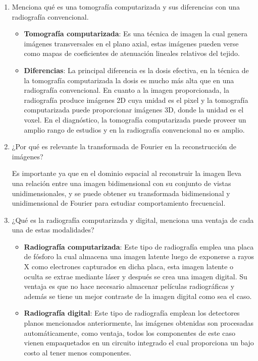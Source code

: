 \begin{enumerate}[1.]
\item Menciona qué es una tomografía computarizada y sus diferencias con una radiografía convencional.


\begin{itemize}
  \item \textbf{Tomografía computarizada}: Es una técnica de imagen la cual genera imágenes transversales en el plano axial, estas imágenes pueden verse como mapas de coeficientes de atenuación lineales relativos del tejido.
  \item \textbf{Diferencias}: La principal diferencia es la dosis efectiva, en la técnica de la tomografía computarizada la dosis es mucho más alta que en una radiografía convencional. En cuanto a la imagen proporcionada, la radiografía produce imágenes 2D cuya unidad es el pixel y la tomografía computarizada puede proporcionar imágenes 3D, donde la unidad es el voxel. En el diagnóstico, la tomografía computarizada puede proveer un amplio rango de estudios y en la radiografía convencional no es amplio.
\end{itemize}

\item ¿Por qué es relevante la transformada de Fourier en la reconstrucción de imágenes?


Es importante ya que en el dominio espacial al reconstruir la imagen lleva una relación entre una imagen bidimensional con su conjunto de vistas unidimensionales, y se puede obtener su transformada bidimensional y unidimensional de Fourier para estudiar comportamiento frecuencial.

\item  ¿Qué es la radiografía computarizada y digital, menciona una ventaja de cada una de estas modalidades?

\begin{itemize}
  \item \textbf{Radiografía computarizada}: Este tipo de radiografía emplea una placa de fósforo la cual almacena una imagen latente luego de exponerse a rayos X como electrones capturados en dicha placa, esta imagen latente o oculta se extrae mediante láser y después se crea una imagen digital. Su ventaja es que no hace necesario almacenar películas radiográficas y además se tiene un mejor contraste de la imagen digital como sea el caso. 
  \item \textbf{Radiografía digital}:  Este tipo de radiografía emplean los detectores planos mencionados anteriormente, las imágenes obtenidas son procesadas automáticamente, como ventaja, todos los componentes de este caso vienen empaquetados en un circuito integrado el cual proporciona un bajo costo al tener menos componentes.
\end{itemize}




\end{enumerate}
